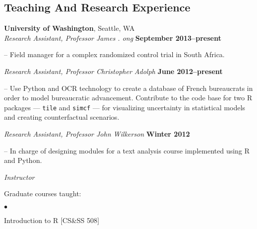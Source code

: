 \documentclass[margin,line]{res}
\newenvironment{list1}{
  \begin{list}{\ding{113}}{%
      \setlength{\itemsep}{0in}
      \setlength{\parsep}{0in} \setlength{\parskip}{0in}
      \setlength{\topsep}{0in} \setlength{\partopsep}{0in} 
      \setlength{\leftmargin}{0.17in}}}{\end{list}}
\newenvironment{list2}{
  \begin{list}{$\bullet$}{%
      \setlength{\itemsep}{0in}
      \setlength{\parsep}{0in} \setlength{\parskip}{0in}
      \setlength{\topsep}{0in} \setlength{\partopsep}{0in} 
      \setlength{\leftmargin}{0.2in}}}{\end{list}}
\begin{document}
{\begin{resume}
\section{\sc Teaching And Research Experience}
{\bf University of Washington}, Seattle, WA \\
{\em Research Assistant, Professor James . ong} \hfill {\bf September 2013--present}\\
\vspace{-.1in}
\begin{list1}
\item[]-- Field manager for a complex randomized control trial in South Africa.
\end{list1}
{\em Research Assistant, Professor Christopher Adolph} \hfill {\bf June 2012--present}\\
\vspace{-.1in}
\begin{list1}
\item[]-- Use Python and OCR technology to create a database of French
bureaucrats in order to model bureaucratic advancement. Contribute to
the code base for two R packages --- \texttt{tile} and
\texttt{simcf} --- for visualizing uncertainty in
statistical models and creating counterfactual scenarios. 
\end{list1}
{\em Research Assistant, Professor John Wilkerson} \hfill {\bf Winter 2012}\\
\vspace{-.1in}
\begin{list1}
\item[]-- In charge of designing modules for a text analysis course implemented using R
and Python. 
\end{list1}

{\em Instructor}\\
\vspace{-.1in}
\begin{list1}
 \item[] Graduate courses taught:
   \begin{list2}
   \item[] Introduction to R  [CS\&SS 508]
\end{list2}
\end{list1}


\end{resume}}
\end{document}
